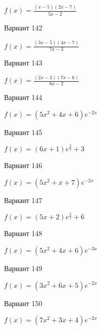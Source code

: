 \documentclass[11pt]{report}
\begin{document}
$f(x) = \frac{\left(x - 5\right) \left(2 x - 7\right)}{5 x - 2}$

Вариант 142

$f(x) = \frac{\left(3 x - 5\right) \left(4 x - 7\right)}{7 x - 3}$

Вариант 143

$f(x) = \frac{\left(2 x - 3\right) \left(7 x - 6\right)}{6 x - 2}$

Вариант 144

$f(x) = \left(5 x^{2} + 4 x + 6\right) e^{- 2 x}$

Вариант 145

$f(x) = \left(6 x + 1\right) e^{\frac{2}{x}} + 3$

Вариант 146

$f(x) = \left(5 x^{2} + x + 7\right) e^{- 2 x}$

Вариант 147

$f(x) = \left(5 x + 2\right) e^{\frac{4}{x}} + 6$

Вариант 148

$f(x) = \left(5 x^{2} + 4 x + 6\right) e^{- 3 x}$

Вариант 149

$f(x) = \left(3 x^{2} + 6 x + 5\right) e^{- 2 x}$

Вариант 150

$f(x) = \left(7 x^{2} + 3 x + 4\right) e^{- 2 x}$
\end{document}
